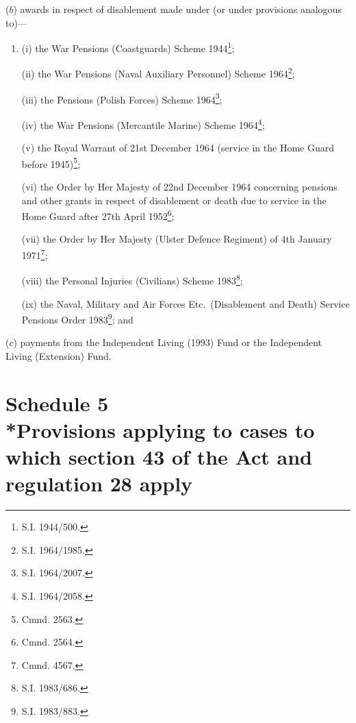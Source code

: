 \documentclass[12pt,a4paper]{article}
\begin{document}
\begin{enumerate}
($b$) awards in respect of disablement made under (or under provisions analogous to)—
\begin{enumerate}\item[]
(i) the War Pensions (Coastguards) Scheme 1944\footnote{\frenchspacing S.I. 1944/500.};

(ii) the War Pensions (Naval Auxiliary Personnel) Scheme 1964\footnote{\frenchspacing S.I. 1964/1985.};

(iii) the Pensions (Polish Forces) Scheme 1964\footnote{\frenchspacing S.I. 1964/2007.};

(iv) the War Pensions (Mercantile Marine) Scheme 1964\footnote{\frenchspacing S.I. 1964/2058.};

(v) the Royal Warrant of 21st December 1964 (service in the Home Guard before 1945)\footnote{\frenchspacing Cmnd. 2563.};

(vi) the Order by Her Majesty of 22nd December 1964 concerning pensions and other grants in respect of disablement or death due to service in the Home Guard after 27th April 1952\footnote{\frenchspacing Cmnd. 2564.};

(vii) the Order by Her Majesty (Ulster Defence Regiment) of 4th January 1971\footnote{\frenchspacing Cmnd. 4567.};

(viii) the Personal Injuries (Civilians) Scheme 1983\footnote{\frenchspacing S.I. 1983/686.};

(ix) the Naval, Military and Air Forces Etc.\ (Disablement and Death) Service Pensions Order 1983\footnote{\frenchspacing S.I. 1983/883.}; and
\end{enumerate}

($c$) payments from 
the Independent Living (1993) Fund or the Independent Living (Extension) Fund. %
\end{enumerate}



\part[Schedule 5 --- Provisions applying to cases to which section 43 of the Act and regulation 28 apply]{Schedule 5\\*Provisions applying to cases to which section 43 of the Act and regulation 28 apply}
\end{document}

